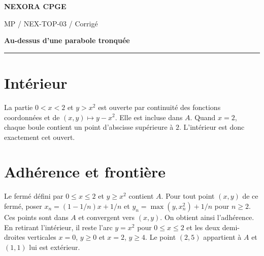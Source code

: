 \documentclass[11pt,a4paper]{article}
\begin{document}
{\small\bfseries\color{nexorablue} NEXORA CPGE}\par
{\small MP / NEX-TOP-03 / Corrigé}\par
{\LARGE\bfseries Au-dessus d’une parabole tronquée}\par
\vspace{0.25em}\hrule\vspace{0.6em}

\section*{Intérieur}
La partie $0<x<2$ et $y>x^2$ est ouverte par continuité des fonctions coordonnées et de $(x,y)\mapsto y-x^2$. Elle est incluse dans $A$. Quand $x=2$, chaque boule contient un point d’abscisse supérieure à $2$. L’intérieur est donc exactement cet ouvert.

\section*{Adhérence et frontière}
Le fermé défini par $0\le x\le2$ et $y\ge x^2$ contient $A$. Pour tout point $(x,y)$ de ce fermé, poser $x_n=(1-1/n)x+1/n$ et $y_n=\max(y,x_n^2)+1/n$ pour $n\ge2$. Ces points sont dans $A$ et convergent vers $(x,y)$. On obtient ainsi l’adhérence. En retirant l’intérieur, il reste l’arc $y=x^2$ pour $0\le x\le2$ et les deux demi-droites verticales $x=0$, $y\ge0$ et $x=2$, $y\ge4$. Le point $(2,5)$ appartient à $A$ et $(1,1)$ lui est extérieur.
\end{document}
